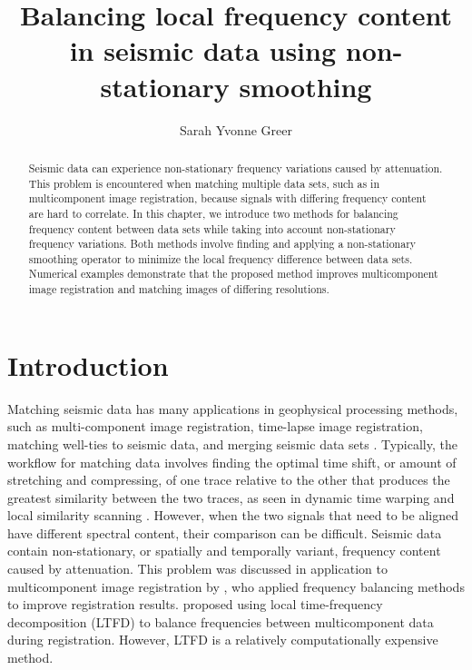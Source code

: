 \renewcommand{\thefootnote}{\fnsymbol{footnote}}
\title{Balancing local frequency content in seismic data using non-stationary smoothing}
\relax{}
\author{Sarah Yvonne Greer}
\label{ch:chapter-locfreq}

\maketitle

\begin{abstract}
        Seismic data can experience non-stationary frequency variations caused by attenuation. 
        This problem is encountered when matching multiple data sets, such as in multicomponent image registration, because signals with differing frequency content are hard to correlate. 
        In this chapter, we introduce two methods for balancing frequency content between data sets while taking into account non-stationary frequency variations. 
        Both methods involve finding and applying a non-stationary smoothing operator to minimize the local frequency difference between data sets. 
        Numerical examples demonstrate that the proposed method improves multicomponent image registration and matching images of differing resolutions. 
\end{abstract}

\section{Introduction}
        Matching seismic data has many applications in geophysical processing methods, such as multi-component image registration, time-lapse image registration, matching well-ties to seismic data, and merging seismic data sets \cite[]{ps,fomel2003,lumley,herrera2012}.
        Typically, the workflow for matching data involves finding the optimal time shift, or amount of stretching and compressing, of one trace relative to the other that produces the greatest similarity between the two traces, as seen in dynamic time warping and local similarity scanning \cite[]{hale2013, timelapse, herrera}. 
        However, when the two signals that need to be aligned have different spectral content, their comparison can be difficult. 
        Seismic data contain non-stationary, or spatially and temporally variant, frequency content caused by attenuation. 
        This problem was discussed in application to multicomponent image registration by \cite{fomel2003}, who applied frequency balancing methods to improve registration results. 
        \cite{ltft} proposed using local time-frequency decomposition (LTFD) to balance frequencies between multicomponent data during registration. 
        However, LTFD is a relatively computationally expensive method.
        
